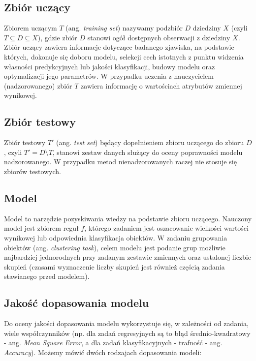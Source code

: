 \documentclass[]{book}
\theoremstyle{plain}
\theoremstyle{definition}
\theoremstyle{definition}
\theoremstyle{definition}
\theoremstyle{definition}
\theoremstyle{remark}
\begin{document}
\hypertarget{zbior-uczacy}{%
\subsection{Zbiór uczący}\label{zbior-uczacy}}

Zbiorem uczącym \(T\) (ang. \emph{training set}) nazywamy podzbiór \(D\) dziedziny \(X\) (czyli \(T\subseteq D\subseteq X\)), gdzie zbiór \(D\) stanowi ogół dostępnych obserwacji z dziedziny \(X\). Zbiór uczący zawiera informacje dotyczące badanego zjawiska, na podstawie których, dokonuje się doboru modelu, selekcji cech istotnych z punktu widzenia własności predykcyjnych lub jakości klasyfikacji, budowy modelu oraz optymalizacji jego parametrów. W przypadku uczenia z nauczycielem (nadzorowanego) zbiór \(T\) zawiera informację o wartościach atrybutów zmiennej wynikowej.

\hypertarget{zbior-testowy}{%
\subsection{Zbiór testowy}\label{zbior-testowy}}

Zbiór testowy \(T'\) (ang. \emph{test set}) będący dopełnieniem zbioru uczącego do zbioru \(D\), czyli \(T'=D\setminus T\), stanowi zestaw danych służący do oceny poprawności modelu nadzorowanego. W przypadku metod nienadzorowanych raczej nie stosuje się zbiorów testowych.

\hypertarget{model}{%
\subsection{Model}\label{model}}

Model to narzędzie pozyskiwania wiedzy na podstawie zbioru uczącego. Nauczony model jest zbiorem reguł \(f\), którego zadaniem jest oszacowanie wielkości wartości wynikowej lub odpowiednia klasyfikacja obiektów. W zadaniu grupowania obiektów (ang. \emph{clustering task}), celem modelu jest podanie grup możliwie najbardziej jednorodnych przy zadanym zestawie zmiennych oraz ustalonej liczbie skupień (czasami wyznaczenie liczby skupień jest również częścią zadania stawianego przed modelem).

\hypertarget{jakosc-dopasowania-modelu}{%
\subsection{Jakość dopasowania modelu}\label{jakosc-dopasowania-modelu}}

Do oceny jakości dopasowania modelu wykorzystuje się, w zależności od zadania, wiele współczynników (np. dla zadań regresyjnych są to błąd średnio-kwadratowy - ang. \emph{Mean Square Error}, a dla zadań klasyfikacyjnych - trafność - ang. \emph{Accuracy}). Możemy mówić dwóch rodzajach dopasowania modeli:
\end{document}
